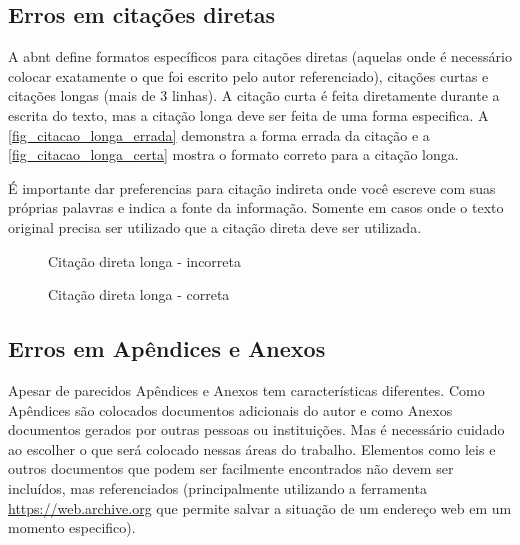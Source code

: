 \subsection{Erros em citações diretas}
\label{erros-citacoes-diretas}

A \ac{abnt} define formatos específicos para citações diretas (aquelas onde é necessário colocar exatamente o que foi escrito pelo autor referenciado), citações curtas e citações longas (mais de 3 linhas). A citação curta é feita diretamente durante a escrita do texto, mas a citação longa deve ser feita de uma forma especifica. A \autoref{fig_citacao_longa_errada} demonstra a forma errada da citação e a \autoref{fig_citacao_longa_certa} mostra o formato correto para a citação longa.

É importante dar preferencias para citação indireta onde você escreve com suas próprias palavras e indica a fonte da informação. Somente em casos onde o texto original precisa ser utilizado que a citação direta deve ser utilizada.

\begin{figure}[hbt]
    \centering
    \caption{Citação direta longa - incorreta}
    \label{fig_citacao_longa_errada}
\end{figure}

\begin{figure}[htb]
    \centering
    \caption{Citação direta longa - correta}
    \label{fig_citacao_longa_certa}
\end{figure}


\subsection{Erros em Apêndices e Anexos}
\label{erros-apendices-e-anexos}

Apesar de parecidos Apêndices e Anexos tem características diferentes. Como Apêndices são colocados documentos adicionais do autor e como Anexos documentos gerados por outras pessoas ou instituições. Mas é necessário cuidado ao escolher o que será colocado nessas áreas do trabalho. Elementos como leis e outros documentos que podem ser facilmente encontrados não devem ser incluídos, mas referenciados (principalmente utilizando a ferramenta \url{https://web.archive.org} que permite salvar a situação de um endereço web em um momento especifico).  

